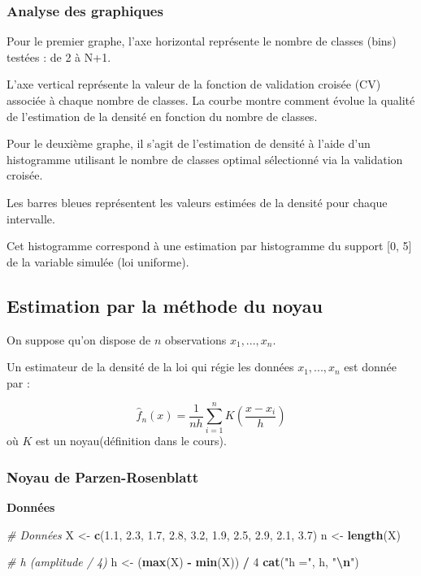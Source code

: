 \documentclass[
  12pt,
]{article}
\newenvironment{Shaded}{\begin{snugshade}}{\end{snugshade}}
\newcommand{\CommentTok}[1]{\textcolor[rgb]{0.56,0.35,0.01}{\textit{#1}}}
\newcommand{\DecValTok}[1]{\textcolor[rgb]{0.00,0.00,0.81}{#1}}
\newcommand{\FloatTok}[1]{\textcolor[rgb]{0.00,0.00,0.81}{#1}}
\newcommand{\FunctionTok}[1]{\textcolor[rgb]{0.13,0.29,0.53}{\textbf{#1}}}
\newcommand{\NormalTok}[1]{#1}
\newcommand{\OtherTok}[1]{\textcolor[rgb]{0.56,0.35,0.01}{#1}}
\newcommand{\SpecialCharTok}[1]{\textcolor[rgb]{0.81,0.36,0.00}{\textbf{#1}}}
\newcommand{\StringTok}[1]{\textcolor[rgb]{0.31,0.60,0.02}{#1}}
\begin{document}
\subsubsection{Analyse des graphiques}\label{analyse-des-graphiques}

Pour le premier graphe, l'axe horizontal représente le nombre de classes
(bins) testées : de 2 à N+1.

L'axe vertical représente la valeur de la fonction de validation croisée
(CV) associée à chaque nombre de classes. La courbe montre comment
évolue la qualité de l'estimation de la densité en fonction du nombre de
classes.

Pour le deuxième graphe, il s'agit de l'estimation de densité à l'aide
d'un histogramme utilisant le nombre de classes optimal sélectionné via
la validation croisée.

Les barres bleues représentent les valeurs estimées de la densité pour
chaque intervalle.

Cet histogramme correspond à une estimation par histogramme du support
{[}0, 5{]} de la variable simulée (loi uniforme).

\subsection{Estimation par la méthode du
noyau}\label{estimation-par-la-muxe9thode-du-noyau}

On suppose qu'on dispose de \(n\) observations \(x_1,..., x_n\).

Un estimateur de la densité de la loi qui régie les données
\(x_1,..., x_n\) est donnée par :

\[\hat{f}_n(x) = \frac{1}{n h} \sum_{i=1}^n K\left(\frac{x - x_i}{h}\right)\]
où \(K\) est un noyau(définition dans le cours).

\subsubsection{Noyau de
Parzen-Rosenblatt}\label{noyau-de-parzen-rosenblatt}

\textbf{Données}

\begin{Shaded}
\begin{Highlighting}[]
\CommentTok{\# Données}
\NormalTok{X }\OtherTok{\textless{}{-}} \FunctionTok{c}\NormalTok{(}\FloatTok{1.1}\NormalTok{, }\FloatTok{2.3}\NormalTok{, }\FloatTok{1.7}\NormalTok{, }\FloatTok{2.8}\NormalTok{, }\FloatTok{3.2}\NormalTok{, }\FloatTok{1.9}\NormalTok{, }\FloatTok{2.5}\NormalTok{, }\FloatTok{2.9}\NormalTok{, }\FloatTok{2.1}\NormalTok{, }\FloatTok{3.7}\NormalTok{)}
\NormalTok{n }\OtherTok{\textless{}{-}} \FunctionTok{length}\NormalTok{(X)}

\CommentTok{\#  h (amplitude / 4)}
\NormalTok{h }\OtherTok{\textless{}{-}}\NormalTok{ (}\FunctionTok{max}\NormalTok{(X) }\SpecialCharTok{{-}} \FunctionTok{min}\NormalTok{(X)) }\SpecialCharTok{/} \DecValTok{4}
\FunctionTok{cat}\NormalTok{(}\StringTok{"h ="}\NormalTok{, h, }\StringTok{"}\SpecialCharTok{\textbackslash{}n}\StringTok{"}\NormalTok{)}
\end{Highlighting}
\end{Shaded}
\end{document}
